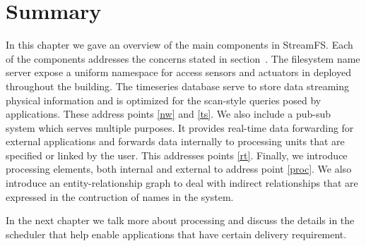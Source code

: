 \section{Summary}


In this chapter we gave an overview of the main components in StreamFS.  Each of the components addresses the concerns stated in 
section~\cite{sec:shortcomings}.  The filesystem name server expose a uniform namespace for access sensors and actuators in 
deployed throughout the building.  The timeseries database serve to store data streaming physical information and 
is optimized for the scan-style queries posed by applications.  These address points \ref{nw} and \ref{ts}.
We also include a pub-sub system which serves multiple purposes.  It provides real-time data forwarding for external
applications and forwards data internally to processing units that are specified or linked by the user.
This addresses points \ref{rt}.  Finally, we introduce processing elements, both internal and external to address
point \ref{proc}.  We also introduce an entity-relationship graph to deal with indirect relationships that are
expressed in the contruction of names in the system.

In the next chapter we talk more about processing and discuss the details in the scheduler that help enable applications
that have certain delivery requirement.

